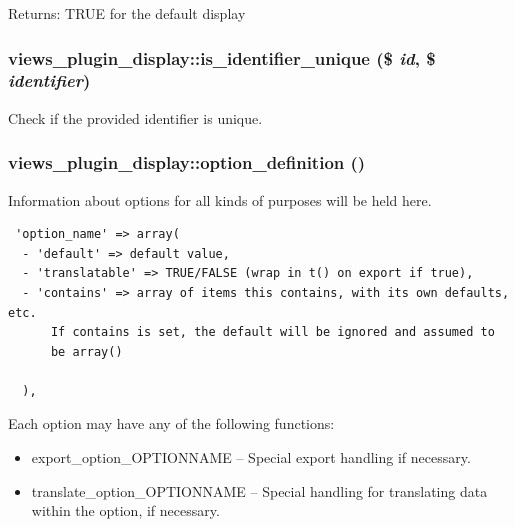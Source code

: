 \begin{Desc}
\item[Returns:]TRUE for the default display \end{Desc}
\hypertarget{classviews__plugin__display_089aaa0e268fbbc4aae2db742a7f036d}{
\subsubsection[{is\_\-identifier\_\-unique}]{\setlength{\rightskip}{0pt plus 5cm}views\_\-plugin\_\-display::is\_\-identifier\_\-unique (\$ {\em id}, \/  \$ {\em identifier})}}
\label{classviews__plugin__display_089aaa0e268fbbc4aae2db742a7f036d}


Check if the provided identifier is unique. \hypertarget{classviews__plugin__display_6eb433a3ccd4225c11b54955d86e2e01}{
\subsubsection[{option\_\-definition}]{\setlength{\rightskip}{0pt plus 5cm}views\_\-plugin\_\-display::option\_\-definition ()}}
\label{classviews__plugin__display_6eb433a3ccd4225c11b54955d86e2e01}


Information about options for all kinds of purposes will be held here. 

\begin{Code}\begin{verbatim} 'option_name' => array(
  - 'default' => default value,
  - 'translatable' => TRUE/FALSE (wrap in t() on export if true),
  - 'contains' => array of items this contains, with its own defaults, etc.
      If contains is set, the default will be ignored and assumed to
      be array()

  ),
\end{verbatim}
\end{Code}

 Each option may have any of the following functions:\begin{itemize}
\item export\_\-option\_\-OPTIONNAME -- Special export handling if necessary.\item translate\_\-option\_\-OPTIONNAME -- Special handling for translating data within the option, if necessary. \end{itemize}


